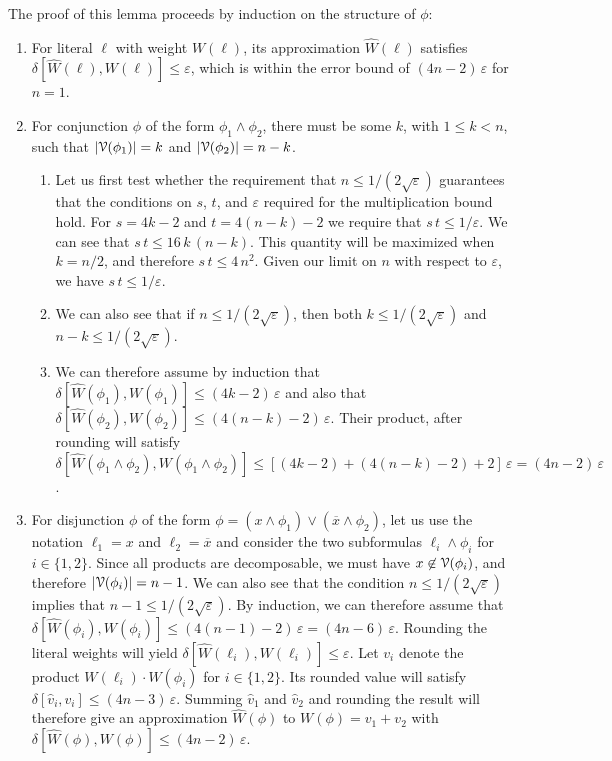 \documentclass[letterpaper,USenglish,cleveref, autoref, thm-restate]{lipics-v2021}
\newcommand{\obar}[1]{\overline{#1}}
\newcommand{\lit}{\ell}
\newcommand{\approximate}[1]{\hat{#1}}
\newcommand{\approxv}{\approximate{v}}
\newcommand{\approxW}{\approximate{W}}
\newcommand{\aerror}{\delta}
\newcommand{\roundepsilon}{\varepsilon}
\newcommand{\dependencyset}{{\cal V}}
\begin{document}
The proof of this lemma proceeds by induction on the structure of $\phi$:
\begin{enumerate}
\item For literal $\lit$ with weight $W(\lit)$, its approximation $\approxW(\lit)$ satisfies
$\aerror[\approxW(\lit), W(\lit)] \leq \roundepsilon$, which is within the error bound of $(4n-2)\,\roundepsilon$ for $n=1$.
\item For conjunction $\phi$ of the form $\phi_1 \land \phi_2$, there must be some $k$, with $1 \leq k < n$, such that $|\dependencyset(\phi_1)| = k$
  and $|\dependencyset(\phi_2)| = n-k$.
\begin{enumerate}
\item Let us first test whether the requirement that $n \leq 1/(2\sqrt{\roundepsilon})$ 
  guarantees that the conditions on $s$, $t$, and $\roundepsilon$ required for the multiplication bound  hold.
For $s = 4k-2$ and $t = 4(n-k)-2$
    we require that $s\,t \leq 1/\roundepsilon$.  We can see that $s\,t \leq 16\,k\,(n-k)$. This quantity will be maximized when $k = n/2$,
    and therefore $s \, t \leq 4\,n^2$.
    Given our limit on $n$ with respect to $\roundepsilon$, we have $s \, t \leq 1/\roundepsilon$.
  \item
    We can also see that if $n \leq 1/(2\sqrt{\roundepsilon})$, then both
    $k \leq 1/(2\sqrt{\roundepsilon})$ and  $n-k \leq 1/(2\sqrt{\roundepsilon})$.
  \item
We can therefore assume by induction that 
 $\aerror[\approxW(\phi_1), W(\phi_1)] \leq (4 k-2) \,\roundepsilon$
  and also that $\aerror[\approxW(\phi_2), W(\phi_2)] \leq (4 (n-k)-2) \,\roundepsilon$.  Their product, after rounding
  will satisfy 
$\aerror[\approxW(\phi_1 \land \phi_2), W(\phi_1 \land \phi_2)] \leq [(4 k -2) + (4 (n-k) -2) + 2]\,\roundepsilon = (4n-2) \,\roundepsilon$.
\end{enumerate}
\item For disjunction $\phi$ of the form
  $\phi = (x \land \phi_1) \lor (\obar{x} \land \phi_2)$, let us use the notation $\lit_1 = x$ and $\lit_2 = \obar{x}$
  and consider the two subformulas $\lit_i \land \phi_i$ for $i \in \{1,2\}$.
  Since all products are decomposable, we must have $x \not \in \dependencyset(\phi_i)$,
  and therefore $|\dependencyset(\phi_i)| = n-1$.  We can also see that the condition 
  $n \leq 1/(2\sqrt{\roundepsilon})$ implies that   $n-1 \leq 1/(2\sqrt{\roundepsilon})$.
  By induction, we can therefore assume that
  $\aerror[\approxW(\phi_i), W(\phi_i)] \leq (4(n-1)-2) \,\roundepsilon = (4n-6)\,\roundepsilon$.  Rounding the literal weights will yield
  $\aerror[\approxW(\lit_i), W(\lit_i)] \leq \roundepsilon$.  Let $v_i$ denote the product $W(\lit_i) \cdot W(\phi_i)$ for $i \in \{1,2\}$.
  Its rounded value will satisfy
  $\aerror[\approxv_i, v_i] \leq (4n-3) \,\roundepsilon$.  Summing $\approxv_1$ and $\approxv_2$ and rounding the result will therefore give
  an approximation $\approxW(\phi)$ to $W(\phi) = v_1 + v_2$ with
$\aerror[\approxW(\phi), W(\phi)] \leq (4n-2)\,\roundepsilon$.  
\end{enumerate}
\end{document}
